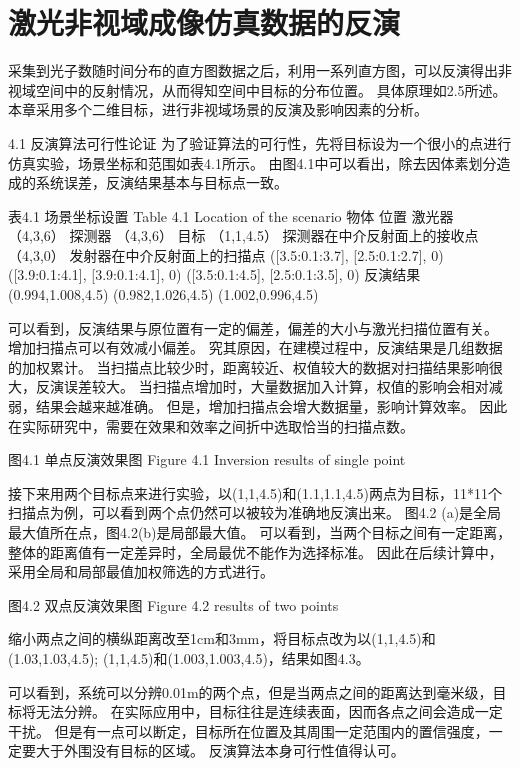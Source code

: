 \chapter{激光非视域成像仿真数据的反演}\label{chap:Simulation}
采集到光子数随时间分布的直方图数据之后，利用一系列直方图，可以反演得出非视域空间中的反射情况，从而得知空间中目标的分布位置。
具体原理如2.5所述。
本章采用多个二维目标，进行非视域场景的反演及影响因素的分析。

4.1  反演算法可行性论证
为了验证算法的可行性，先将目标设为一个很小的点进行仿真实验，场景坐标和范围如表4.1所示。
由图4.1中可以看出，除去因体素划分造成的系统误差，反演结果基本与目标点一致。


表4.1  场景坐标设置
Table 4.1 Location of the scenario
物体	位置
激光器	（4,3,6）
探测器	（4,3,6）
目标	（1,1,4.5）
探测器在中介反射面上的接收点	（4,3,0）
发射器在中介反射面上的扫描点	([3.5:0.1:3.7],
[2.5:0.1:2.7],
0)	([3.9:0.1:4.1],
[3.9:0.1:4.1],
0)	([3.5:0.1:4.5],
[2.5:0.1:3.5],
0)
反演结果	(0.994,1.008,4.5)	(0.982,1.026,4.5)	(1.002,0.996,4.5)

可以看到，反演结果与原位置有一定的偏差，偏差的大小与激光扫描位置有关。
增加扫描点可以有效减小偏差。
究其原因，在建模过程中，反演结果是几组数据的加权累计。
当扫描点比较少时，距离较近、权值较大的数据对扫描结果影响很大，反演误差较大。
当扫描点增加时，大量数据加入计算，权值的影响会相对减弱，结果会越来越准确。
但是，增加扫描点会增大数据量，影响计算效率。
因此在实际研究中，需要在效果和效率之间折中选取恰当的扫描点数。


   
图4.1  单点反演效果图
Figure 4.1 Inversion results of single point

接下来用两个目标点来进行实验，以(1,1,4.5)和(1.1,1.1,4.5)两点为目标，11*11个扫描点为例，可以看到两个点仍然可以被较为准确地反演出来。
图4.2 (a)是全局最大值所在点，图4.2(b)是局部最大值。
可以看到，当两个目标之间有一定距离，整体的距离值有一定差异时，全局最优不能作为选择标准。
因此在后续计算中，采用全局和局部最值加权筛选的方式进行。


  
图4.2  双点反演效果图
Figure 4.2 results of two points

缩小两点之间的横纵距离改至1cm和3mm，将目标点改为以(1,1,4.5)和(1.03,1.03,4.5); (1,1,4.5)和(1.003,1.003,4.5)，结果如图4.3。

可以看到，系统可以分辨0.01m的两个点，但是当两点之间的距离达到毫米级，目标将无法分辨。
在实际应用中，目标往往是连续表面，因而各点之间会造成一定干扰。
但是有一点可以断定，目标所在位置及其周围一定范围内的置信强度，一定要大于外围没有目标的区域。
反演算法本身可行性值得认可。

